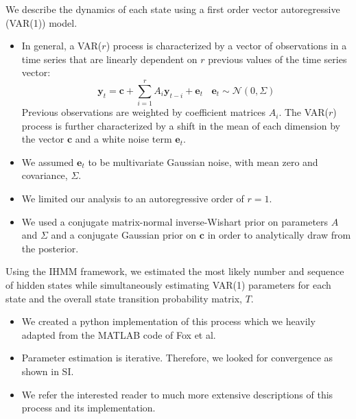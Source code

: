 \documentclass{article}
\begin{document}
  \noindent We describe the dynamics of each state using a first order vector autoregressive
   (VAR(1)) model. 
  \begin{itemize}
  	\item In general, a VAR($r$) process is characterized by a vector of observations in a time series 
  	that are linearly dependent on $r$ previous values of the time series vector:
  	\begin{equation}
  	\mathbf{y}_t = \mathbf{c} + \sum_{i=1}^r A_i\mathbf{y}_{t-i} + \mathbf{e}_t~~~~\mathbf{e}_t \sim \mathcal{N}(0, \Sigma)
  	\label{eqn:var}
  	\end{equation}
  	Previous observations are weighted by coefficient matrices $A_i$. The VAR($r$) 
  	process is further characterized by a shift in the mean of each dimension by the
  	vector $\mathbf{c}$ and a white noise term $\mathbf{e}_t$.~\cite{hamilton_time_1994}
  	\item We assumed $\mathbf{e}_t$ to be multivariate Gaussian noise, with mean zero and
  	covariance, $\Sigma$.
  	\item We limited our analysis to an autoregressive order of $r=1$.
  	\item We used a conjugate matrix-normal inverse-Wishart prior on parameters
  	$A$ and $\Sigma$ and a conjugate Gaussian prior on $\mathbf{c}$ in order to analytically
  	draw from the posterior.~\cite{fox_nonparametric_2009}
  \end{itemize}   
  
  Using the IHMM framework, we estimated the most likely number and sequence of hidden states
  while simultaneously estimating VAR(1) parameters for each state and the overall 
  state transition probability matrix, $T$.
  \begin{itemize}
    \item We created a python implementation of this process which we heavily adapted from
    the MATLAB code of Fox et al.~\cite{fox_sticky_2007} 
    \item Parameter estimation is iterative. Therefore, we looked for convergence 
    as shown in SI.
    \item We refer the interested reader to much more extensive descriptions of 
    this process and its implementation. 
    ~\cite{beal_infinite_2002,teh_hierarchical_2006,van_gael_beam_2008,fox_nonparametric_2009,fox_bayesian_2010}
  \end{itemize}
  
\end{document}

